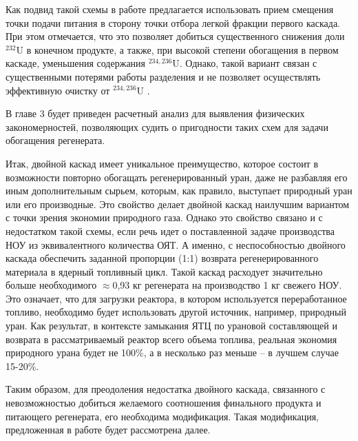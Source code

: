 Как подвид такой схемы в работе \cite{palkinReprocessedUraniumPurification2013} предлагается использовать прием смещения точки подачи питания в сторону точки отбора легкой фракции первого каскада.
При этом отмечается, что это позволяет добиться существенного снижения доли $^{232}$U в конечном продукте, а также, при высокой степени обогащения в первом каскаде, уменьшения содержания $^{234,236}$U.
Однако, такой вариант связан с существенными потерями работы разделения и не позволяет осуществлять эффективную очистку от $^{234,236}$U \cite{palkinPurificationReprocessedUranium2016}.

В главе 3 будет приведен расчетный анализ для выявления физических закономерностей, позволяющих судить о пригодности таких схем для задачи обогащения регенерата.

Итак, двойной каскад имеет уникальное преимущество, которое состоит в возможности повторно обогащать регенерированный уран, даже не разбавляя его иным дополнительным сырьем, которым, как правило, выступает природный уран или его производные.
Это свойство делает двойной каскад наилучшим вариантом с точки зрения экономии природного газа.
Однако это свойство связано и с недостатком такой схемы, если речь идет о поставленной задаче производства НОУ из эквивалентного количества ОЯТ.
А именно, с неспособностью двойного каскада обеспечить заданной пропорции (1:1) возврата регенерированного материала в ядерный топливный цикл.
Такой каскад расходует значительно больше необходимого $\approx$0,93 кг регенерата на производство 1 кг свежего НОУ.
Это означает, что для загрузки реактора, в котором используется переработанное топливо, необходимо будет использовать другой источник, например, природный уран. 
Как результат, в контексте замыкания ЯТЦ по урановой составляющей и возврата в рассматриваемый реактор всего объема топлива, реальная экономия природного урана будет не 100\%, а в несколько раз меньше -- в лучшем случае 15-20\%.

Таким образом, для преодоления недостатка двойного каскада, связанного с невозможностью добиться желаемого соотношения финального продукта и питающего регенерата, его необходима модификация.
Такая модификация, предложенная в работе \cite{smirnovObogashchenieRegenerirovannogoUrana2018}
будет рассмотрена далее.

